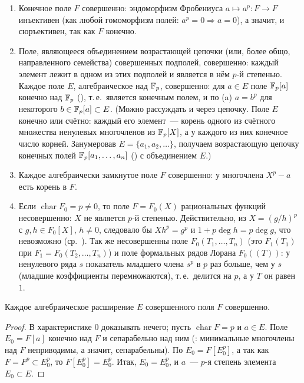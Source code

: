 \begin{example}[2.25]
\begin{enumerate}[label=(\alph*)]
\item Конечное поле $F$ совершенно: эндоморфизм Фробениуса $a\mapsto a^p\colon F\to F$ инъективен (как любой
гомоморфизм полей: $a^p=0\Rightarrow a=0$), а значит, и сюръективен, так как $F$ конечно.
\item Поле, являющееся объединением возрастающей цепочки (или, более общо, направленного семейства) совершенных
подполей, совершенно: каждый элемент лежит в одном из этих подполей и является в нём $p$-й степенью. Каждое поле $E$,
алгебраическое над $\mathbb F_p$, совершенно: для $a\in E$ поле $\mathbb F_p[a]$ конечно над $\mathbb F_p$ (), т.\,е.\ является
конечным полем, и по (a) $a=b^p$ для некоторого $b\in\mathbb F_p[a]\subset E$. (Можно рассуждать и через цепочку. Поле $E$
конечно или счётно: каждый его элемент~--- корень одного из счётного множества ненулевых многочленов из $\mathbb F_p[X]$, а у
каждого из них конечное число корней. Занумеровав $E=\{a_1,a_2,\dots\}$, получаем возрастающую цепочку конечных полей
$\mathbb F_p[a_1,\dots,a_n]$ () с объединением $E$.)
\item Каждое алгебраически замкнутое поле $F$ совершенно: у многочлена $X^p-a$ есть корень в $F$.
\item Если $\operatorname{char}F_0=p\ne0$, то поле $F=F_0(X)$ рациональных функций несовершенно: $X$ не является $p$-й
степенью. Действительно, из $X=(g/h)^p$ с $g,h\in F_0[X]$, $h\ne0$, следовало бы $Xh^p=g^p$ и
$1+p\deg h=p\deg g$, что невозможно (ср.\ ). Так же несовершенны поле $F_0(T_1,\dots,T_n)$ (это $F_1(T_1)$
при $F_1=F_0(T_2,\dots,T_n)$) и поле формальных рядов Лорана $F_0((T))$: у ненулевого ряда $s$ показатель младшего
члена $s^p$ в $p$ раз больше, чем у $s$ (младшие коэффициенты перемножаются), т.\,е.\ делится на $p$, а у $T$ он
равен $1$.
\end{enumerate}
\end{example}

\begin{proposition}[2.25a]
Каждое алгебраическое расширение $E$ совершенного поля $F$ совершенно.
\end{proposition}

\begin{proof}
В характеристике $0$ доказывать нечего; пусть $\operatorname{char}F=p$ и $a\in E$. Поле $E_0=F[a]$ конечно над
$F$ и сепарабельно над ним (: минимальные многочлены над $F$ неприводимы, а значит, сепарабельны). По
 $E_0=F[E_0^p]$, а так как $F=F^p\subset E_0^p$, то $F[E_0^p]=E_0^p$. Итак, $E_0=E_0^p$, и $a$~--- $p$-я степень
элемента $E_0\subset E$.
\end{proof}

